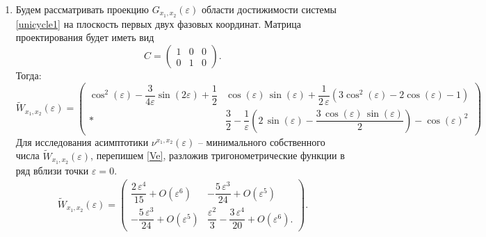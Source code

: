 \documentclass[../main.tex]{subfiles}
\begin{document}
	\begin{enumerate}
		\item Будем рассматривать проекцию $ G_{x_1, x_2}(\varepsilon) $ области достижимости системы \eqref{unicycle1} на плоскость первых двух фазовых координат. Матрица проектирования будет иметь вид
		\begin{equation*}
			C = \begin{pmatrix}
				1 & 0 & 0 \\ 
				0 & 1 & 0 
			\end{pmatrix}. 
		\end{equation*} 
		Тогда: \small
		\begin{equation}\label{Ve}
			\widetilde{W}_{x_1,x_2}(\varepsilon)= \begin{pmatrix}
				\cos^2(\varepsilon)-\dfrac{3}{4\varepsilon}\sin(2\varepsilon)+\dfrac{1}{2} & 
				\cos\left(\varepsilon \right)\,\sin\left(\varepsilon \right)+\dfrac{1}{2\,\varepsilon}\left( 3\cos^2\left(\varepsilon \right)-2\cos\left(\varepsilon\right)-1\right) \\[6pt]
				* &
				\dfrac{3}{2}-\dfrac{1}{\varepsilon }\left(2\,\sin\left(\varepsilon \right)-\dfrac{3\,\cos\left(\varepsilon \right)\,\sin\left(\varepsilon \right)}{2} \right) -{\cos\left(\varepsilon \right)}^2 
			\end{pmatrix}
		\end{equation}
		\normalsize
		Для исследования асимптотики $ \nu^{x_1,x_2}(\varepsilon) $ -- минимального собственного числа $ \widetilde{W}_{x_1,x_2}(\varepsilon) $, перепишем \eqref{Ve}, разложив тригонометрические функции в ряд вблизи точки $ \varepsilon = 0 $.
		\begin{gather*}
			\widetilde{W}_{x_1,x_2}(\varepsilon) = \begin{pmatrix}
				\dfrac{2\,\varepsilon ^4}{15} + O(\varepsilon^6)&
				-\dfrac{5\,\varepsilon ^3}{24} + O(\varepsilon^5)\\[8pt]
				-\dfrac{5\,\varepsilon ^3}{24} + O(\varepsilon^5) & 
				\dfrac{\varepsilon ^2}{3}-\dfrac{3\,\varepsilon ^4}{20} + O(\varepsilon^6).
			\end{pmatrix}.
		\end{gather*}
		

\end{enumerate}
\end{document}
